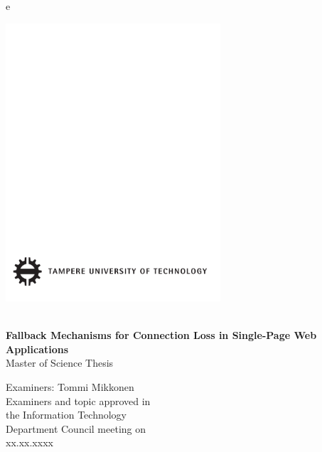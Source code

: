 e 
\thispagestyle{empty}
 
\vspace*{-.5cm}\noindent
 
 
\includegraphics[width=8cm]{assets/tut-logo}
 
\vspace{6.8cm}
 
\\
{\bf\large \textsf{Fallback Mechanisms for Connection Loss in Single-Page Web Applications}}\\
\textsf{Master of Science Thesis}
 
\vspace{8.7cm} %
 
\begin{flushright}
  
\begin{minipage}[c]{6.8cm}
\begin{spacing}{1.0}
\textsf{Examiners: Tommi Mikkonen}\\
\textsf{Examiners and topic approved in}\\ 
\textsf{the Information Technology}\\
\textsf{Department Council meeting on}\\
\textsf{xx.xx.xxxx}\\
\end{spacing}
\end{minipage}
\end{flushright}
 
